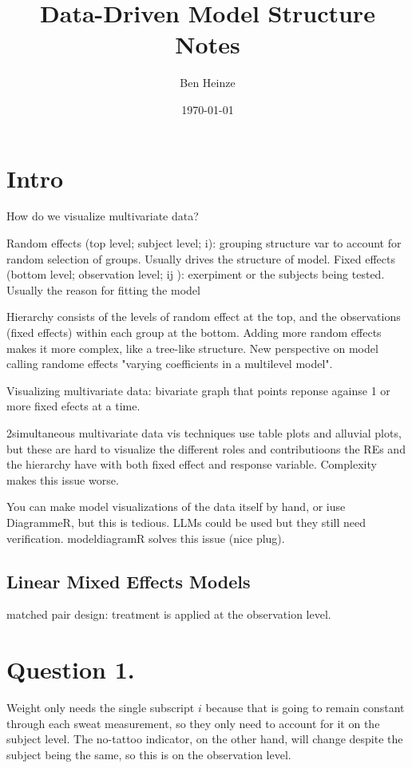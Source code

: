 \documentclass[11pt]{article}
\author{Ben Heinze}
\date{\today}
\title{Data-Driven Model Structure Notes}
\begin{document}
\maketitle


\section{Intro}
\label{sec:orgf92701c}

How do we visualize multivariate data?

Random effects (top level; subject level; i): grouping structure var to account for random selection of groups. Usually drives the structure of model.
Fixed effects (bottom level; observation level; ij ): exerpiment or the subjects being tested. Usually the reason for fitting the model

Hierarchy consists of the levels of random effect at the top, and the observations (fixed effects) within each group at the bottom. Adding more random effects makes it more complex, like a tree-like structure. New perspective on model calling randome effects "varying coefficients in a multilevel model".

Visualizing multivariate data: bivariate graph that points reponse againse 1 or more fixed efects at a time.

2simultaneous multivariate data vis techniques use table plots and alluvial plots, but these are hard to visualize the different roles and contributioons the REs and the hierarchy have with both fixed effect and response variable. Complexity makes this issue worse.

You can make model visualizations of the data itself by hand, or iuse DiagrammeR, but this is tedious. LLMs could be used but they still need verification. modeldiagramR solves this issue (nice plug).

\subsection{Linear Mixed Effects Models}
\label{sec:orga19045d}

matched pair design: treatment is applied at the observation level.



\section{Question 1.}
\label{sec:org27af6d9}

Weight only needs the single subscript \(i\) because that is going to remain constant through each sweat measurement, so they only need to account for it on the subject level. The no-tattoo indicator, on the other hand, will change despite the subject being the same, so this is on the observation level.
\end{document}
